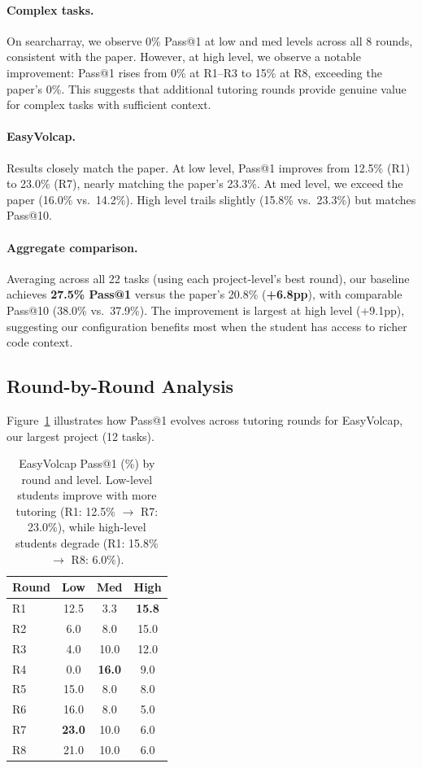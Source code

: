 \documentclass[11pt]{article}
\begin{document}
\paragraph{Complex tasks.} On searcharray, we observe 0\% Pass@1 at low and med levels across all 8 rounds, consistent with the paper. However, at high level, we observe a notable improvement: Pass@1 rises from 0\% at R1--R3 to 15\% at R8, exceeding the paper's 0\%. This suggests that additional tutoring rounds provide genuine value for complex tasks with sufficient context.

\paragraph{EasyVolcap.} Results closely match the paper. At low level, Pass@1 improves from 12.5\% (R1) to 23.0\% (R7), nearly matching the paper's 23.3\%. At med level, we exceed the paper (16.0\% vs.\ 14.2\%). High level trails slightly (15.8\% vs.\ 23.3\%) but matches Pass@10.

\paragraph{Aggregate comparison.} Averaging across all 22 tasks (using each project-level's best round), our baseline achieves \textbf{27.5\% Pass@1} versus the paper's 20.8\% (\textbf{+6.8pp}), with comparable Pass@10 (38.0\% vs.\ 37.9\%). The improvement is largest at high level (+9.1pp), suggesting our configuration benefits most when the student has access to richer code context.

\subsection{Round-by-Round Analysis}

Figure~\ref{fig:rounds} illustrates how Pass@1 evolves across tutoring rounds for EasyVolcap, our largest project (12 tasks).

\begin{table}[t]
  \centering
  \small
  \begin{tabular}{lccc}
    \toprule
    \textbf{Round} & \textbf{Low} & \textbf{Med} & \textbf{High} \\
    \midrule
    R1 & 12.5 & 3.3  & \textbf{15.8} \\
    R2 & 6.0  & 8.0  & 15.0 \\
    R3 & 4.0  & 10.0 & 12.0 \\
    R4 & 0.0  & \textbf{16.0} & 9.0 \\
    R5 & 15.0 & 8.0  & 8.0 \\
    R6 & 16.0 & 8.0  & 5.0 \\
    R7 & \textbf{23.0} & 10.0 & 6.0 \\
    R8 & 21.0 & 10.0 & 6.0 \\
    \bottomrule
  \end{tabular}
  \caption{EasyVolcap Pass@1 (\%) by round and level. Low-level students improve with more tutoring (R1: 12.5\% $\rightarrow$ R7: 23.0\%), while high-level students degrade (R1: 15.8\% $\rightarrow$ R8: 6.0\%).}
  \label{fig:rounds}
\end{table}
\end{document}
